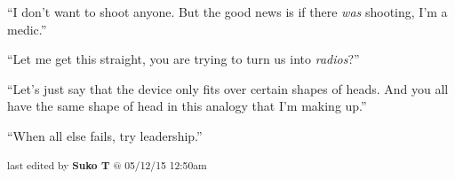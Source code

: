 
 ``I don't want to shoot anyone.  But the good news is if there \textit{was} shooting, I'm a medic.''


``Let me get this straight, you are trying to turn us into \textit{radios}?''




``Let's just say that the device only fits over certain shapes of heads.  And you all have the same shape of head in this analogy that I'm making up.''




``When all else fails, try leadership.''


\vspace{\fill}

\begin{flushright}
\textsubscript{last edited by \textbf{Suko T} @ 05/12/15 12:50am}
\end{flushright}


